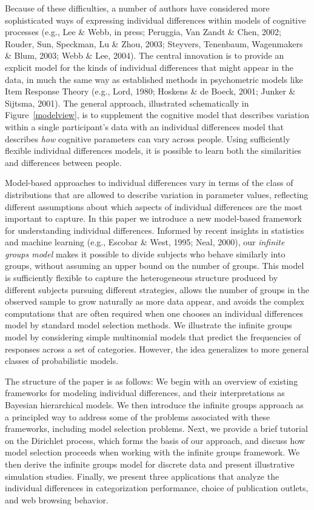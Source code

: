 \documentclass[authoryear]{elsarticle}
\begin{document}
Because of these difficulties, a number of authors have considered
more sophisticated ways of expressing individual differences within models of cognitive processes (e.g., Lee \& Webb, in press; Peruggia, Van Zandt \& Chen,
2002; Rouder, Sun, Speckman, Lu \& Zhou, 2003; Steyvers, Tenenbaum,
Wagenmakers \& Blum, 2003; Webb \& Lee, 2004). The central innovation
is to provide an explicit model for the kinds of individual differences that might
appear in the data, in much the same way as established methods in psychometric models like Item Response Theory
(e.g., Lord, 1980; Hoskens \& de Boeck, 2001; Junker \& Sijtsma, 2001). The general approach, illustrated schematically in Figure~\ref{modelview}, is to supplement the cognitive model  that describes variation within a single participant's data with an individual differences model that describes
\emph{how} cognitive parameters can vary across people. Using sufficiently flexible individual differences models, it is possible to learn both the similarities
and differences between people.

Model-based approaches to individual differences vary in terms of the class
of distributions that are allowed to describe variation in parameter values,
reflecting different assumptions about which aspects of individual differences
are the most important to capture. In this paper we introduce a new model-based
framework for understanding individual differences. Informed by
recent insights in statistics and machine learning (e.g., Escobar \& West,
1995; Neal, 2000), our \emph{infinite groups model} makes it possible to
divide subjects who behave similarly into groups, without assuming an
upper bound on the number of groups. This
model is sufficiently flexible to capture the heterogeneous structure produced
by different subjects pursuing different strategies, allows the number of
groups in the observed sample to grow naturally as more data appear,
and avoids the complex computations that are often required when one
chooses an individual differences model by standard model selection methods.
We illustrate the infinite groups model by considering
simple multinomial models that predict the frequencies of responses across
a set of categories. However, the idea generalizes to more general classes of
probabilistic models.

The structure of the paper is as follows: We begin with an overview of
existing frameworks for modeling individual differences, and their
interpretations as Bayesian hierarchical models. We then introduce
the infinite groups approach as a principled way to address some of the
problems associated with these frameworks, including model selection
problems. Next, we provide a brief tutorial on the Dirichlet process,
which forms the basis of our approach, and discuss how model selection
proceeds when working with the infinite groups framework.
We then derive the infinite groups model for discrete
data and present illustrative simulation studies. Finally, we present
three applications that analyze the individual differences
in categorization performance, choice of publication
outlets, and web browsing behavior.
\end{document}
